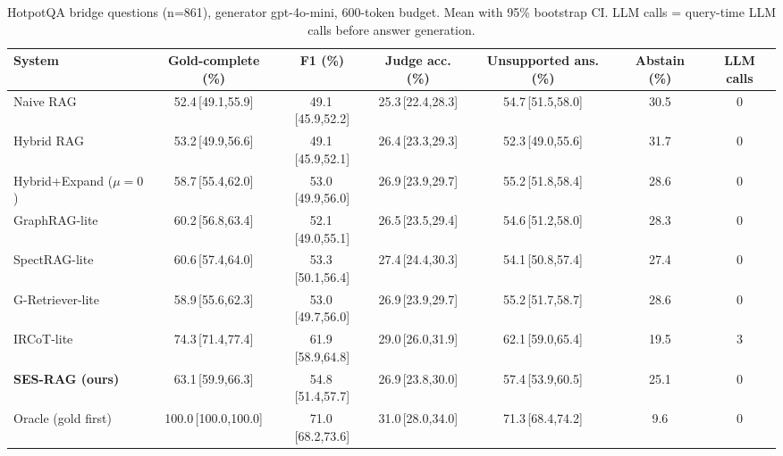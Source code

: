 \begin{table}[t]
\centering
\caption{HotpotQA bridge questions (n=861), generator gpt-4o-mini, 600-token budget. Mean with 95\% bootstrap CI. LLM calls = query-time LLM calls before answer generation.}
\label{tab:main}
\small
\begin{tabular}{lcccccc}
\toprule
System & Gold-complete (\%) & F1 (\%) & Judge acc. (\%) & Unsupported ans. (\%) & Abstain (\%) & LLM calls \\
\midrule
Naive RAG & 52.4\,{\scriptsize[49.1,55.9]} & 49.1\,{\scriptsize[45.9,52.2]} & 25.3\,{\scriptsize[22.4,28.3]} & 54.7\,{\scriptsize[51.5,58.0]} & 30.5 & 0 \\
Hybrid RAG & 53.2\,{\scriptsize[49.9,56.6]} & 49.1\,{\scriptsize[45.9,52.1]} & 26.4\,{\scriptsize[23.3,29.3]} & 52.3\,{\scriptsize[49.0,55.6]} & 31.7 & 0 \\
Hybrid+Expand ($\mu{=}0$) & 58.7\,{\scriptsize[55.4,62.0]} & 53.0\,{\scriptsize[49.9,56.0]} & 26.9\,{\scriptsize[23.9,29.7]} & 55.2\,{\scriptsize[51.8,58.4]} & 28.6 & 0 \\
GraphRAG-lite & 60.2\,{\scriptsize[56.8,63.4]} & 52.1\,{\scriptsize[49.0,55.1]} & 26.5\,{\scriptsize[23.5,29.4]} & 54.6\,{\scriptsize[51.2,58.0]} & 28.3 & 0 \\
SpectRAG-lite & 60.6\,{\scriptsize[57.4,64.0]} & 53.3\,{\scriptsize[50.1,56.4]} & 27.4\,{\scriptsize[24.4,30.3]} & 54.1\,{\scriptsize[50.8,57.4]} & 27.4 & 0 \\
G-Retriever-lite & 58.9\,{\scriptsize[55.6,62.3]} & 53.0\,{\scriptsize[49.7,56.0]} & 26.9\,{\scriptsize[23.9,29.7]} & 55.2\,{\scriptsize[51.7,58.7]} & 28.6 & 0 \\
IRCoT-lite & 74.3\,{\scriptsize[71.4,77.4]} & 61.9\,{\scriptsize[58.9,64.8]} & 29.0\,{\scriptsize[26.0,31.9]} & 62.1\,{\scriptsize[59.0,65.4]} & 19.5 & 3 \\
\textbf{SES-RAG (ours)} & 63.1\,{\scriptsize[59.9,66.3]} & 54.8\,{\scriptsize[51.4,57.7]} & 26.9\,{\scriptsize[23.8,30.0]} & 57.4\,{\scriptsize[53.9,60.5]} & 25.1 & 0 \\
\midrule
Oracle (gold first) & 100.0\,{\scriptsize[100.0,100.0]} & 71.0\,{\scriptsize[68.2,73.6]} & 31.0\,{\scriptsize[28.0,34.0]} & 71.3\,{\scriptsize[68.4,74.2]} & 9.6 & 0 \\
\bottomrule
\end{tabular}
\end{table}